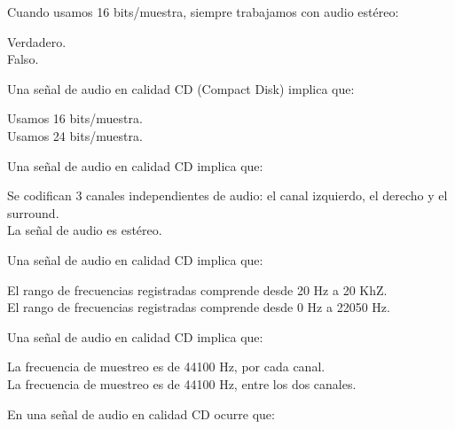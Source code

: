 \documentclass[legalpaper, 12pt, addpoints]{exam}
\begin{document}
\begin{questions}
\question Cuando usamos 16 bits/muestra, siempre trabajamos con audio estéreo:

\begin{oneparchoices}
  \choice Verdadero.\\
  \choice Falso.
\end{oneparchoices}
  
\vspace{0.10in}

\question Una señal de audio en calidad CD (Compact Disk) implica que:

\begin{oneparchoices}
  \choice Usamos 16 bits/muestra.\\
  \choice Usamos 24 bits/muestra.
\end{oneparchoices}
  
\vspace{0.10in}

\question Una señal de audio en calidad CD implica que:

\begin{oneparchoices}
  \choice Se codifican 3 canales independientes de audio: el canal izquierdo, el derecho y el surround.\\
  \choice La señal de audio es estéreo.
\end{oneparchoices}
  
\vspace{0.10in}

\question Una señal de audio en calidad CD implica que:

\begin{oneparchoices}
  \choice El rango de frecuencias registradas comprende desde 20 Hz a 20 KhZ.\\
  \choice El rango de frecuencias registradas comprende desde 0 Hz a 22050 Hz.
\end{oneparchoices}
  
\vspace{0.10in}

\question Una señal de audio en calidad CD implica que:

\begin{oneparchoices}
  \choice La frecuencia de muestreo es de 44100 Hz, por cada canal.\\
  \choice La frecuencia de muestreo es de 44100 Hz, entre los dos canales.
\end{oneparchoices}
  
\vspace{0.10in}

\question En una señal de audio en calidad CD ocurre que:


\end{questions}
\end{document}
